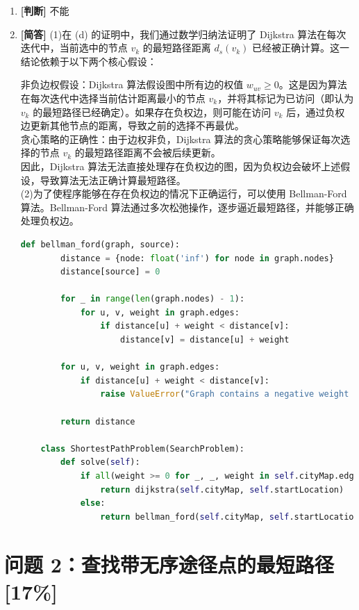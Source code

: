 \documentclass{article}
\begin{document}
\begin{enumerate}[label=(\alph*), start=5]
    \item \textbf{[判断]} %
    不能
    \item \textbf{[简答]} %
    (1)在 (d) 的证明中，我们通过数学归纳法证明了 Dijkstra 算法在每次迭代中，当前选中的节点 $ v_k $ 的最短路径距离 $ d_s(v_k) $ 已经被正确计算。这一结论依赖于以下两个核心假设：
    
    非负边权假设：Dijkstra 算法假设图中所有边的权值 $ w_{uv} \geq 0 $。这是因为算法在每次迭代中选择当前估计距离最小的节点 $ v_k $，并将其标记为已访问（即认为 $ v_k $ 的最短路径已经确定）。如果存在负权边，则可能在访问 $ v_k $ 后，通过负权边更新其他节点的距离，导致之前的选择不再最优。\\
    贪心策略的正确性：由于边权非负，Dijkstra 算法的贪心策略能够保证每次选择的节点 $ v_k $ 的最短路径距离不会被后续更新。\\
    因此，Dijkstra 算法无法直接处理存在负权边的图，因为负权边会破坏上述假设，导致算法无法正确计算最短路径。\\
    (2)为了使程序能够在存在负权边的情况下正确运行，可以使用 Bellman-Ford 算法。Bellman-Ford 算法通过多次松弛操作，逐步逼近最短路径，并能够正确处理负权边。
    \begin{lstlisting}[language=Python]
    def bellman_ford(graph, source):
    	distance = {node: float('inf') for node in graph.nodes}
    	distance[source] = 0
    
    	for _ in range(len(graph.nodes) - 1):
    		for u, v, weight in graph.edges:  
    			if distance[u] + weight < distance[v]:
    				distance[v] = distance[u] + weight
    
    	for u, v, weight in graph.edges:
    		if distance[u] + weight < distance[v]:
    			raise ValueError("Graph contains a negative weight cycle")
    
    	return distance
    
    class ShortestPathProblem(SearchProblem):
    	def solve(self):
    		if all(weight >= 0 for _, _, weight in self.cityMap.edges):
    			return dijkstra(self.cityMap, self.startLocation)
    		else:
    			return bellman_ford(self.cityMap, self.startLocation)
    \end{lstlisting}
\end{enumerate}

\section{问题 2：查找带无序途径点的最短路径[17\%]}
\end{document}
